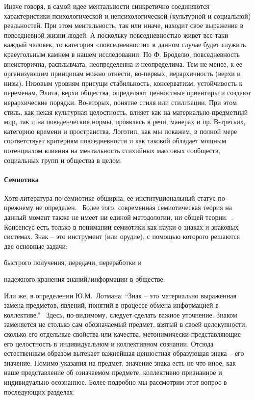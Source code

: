 Иначе говоря, в самой идее ментальности синкретично соединяются характеристики психологической и непсихологической (культурной и социальной) реальностей. При этом ментальность, так или иначе, находит свое выражение в повседневной жизни людей. А поскольку повседневностью живет все-таки каждый человек, то категория «повседневности» в данном случае будет служить краеугольным камнем в нашем исследовании. По Ф. Броделю, повседневность внеисторична, расплывчата, неопределенна и неопределима. Тем не менее, к ее организующим принципам можно отнести, во-первых, иерархичность (верхи и низы). Низовым уровням присущи стабильность, консерватизм, устойчивость к переменам. Элита, верхи общества, определяют ценностные ориентиры и создают иерархические порядки. Во-вторых, понятие стиля или стилизации. При этом стиль, как некая культурная целостность, влияет как на материально-предметный мир, так и на поведенческие нормы, проявлясь в речи, манерах и пр. В-третьих, категорию времени и пространства. Логотип, как мы покажем, в полной мере соответствует критериям повседневности и как таковой обладает мощным потенциалом влияния на ментальность стихийных массовых сообществ, социальных групп и общества в целом.

\paragraph{Семиотика}\label{1.1.3}

Хотя литература по семиотике обширна, ее институциональный статус по-прежнему не определен.~\autocite{sirotkin}
Более того, современная семиотическая теория на данный момент также не имеет ни
единой методологии, ни общей теории.~\autocite{gorny}\autocite{gasparov}. Консенсус есть только в понимании семиотики как науки о знаках и знаковых системах. Знак -- это инструмент (или орудие),
с помощью которого решаются две основные задачи:
\begin{inparaenum}[\itshape 1\upshape)]
    \item быстрого получения, передачи, переработки и
    \item надежного хранения знаний/информации в обществе.
\end{inparaenum} Или же, в определении Ю.М.~Лотмана: ``Знак -- это материально выраженная замена предметов, явлений, понятий в процессе обмена информацией в коллективе.''~\autocite{wiki:symbol}
Здесь, по-видимому, следует сделать важное уточнение. Знаком заменяется не столько сам
обозначаемый предмет, взятый в своей целокупности, сколько его отдельные свойства или
качества, метонимически представляющие его целостность в индивидуальном и коллективном сознании. Отсюда естественным образом вытекает важнейшая ценностная образующая знака -- его значение. Помимо указания на предмет, значение знака есть не что иное, как наше представление об означаемом предмете, коллективно признанное и индивидуально осознанное. Более подробно мы рассмотрим этот вопрос в последующих разделах.

